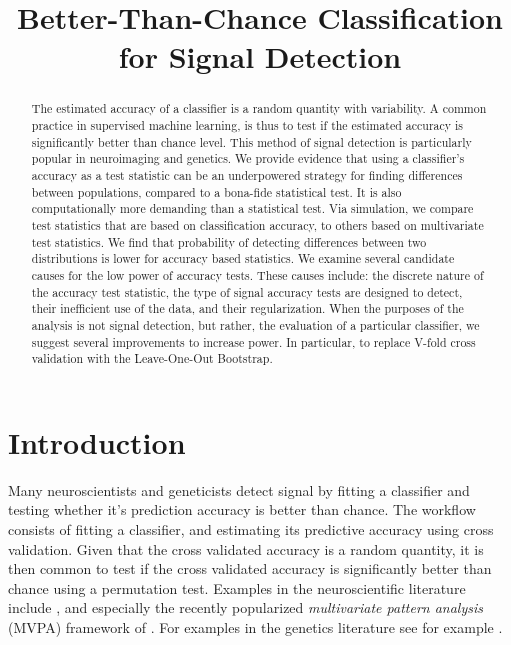 \documentclass[12pt,a4paper]{article}
\title{Better-Than-Chance Classification for Signal Detection}
\begin{document}
\maketitle

\begin{abstract}
The estimated accuracy of a classifier is a random quantity with variability. 
A common practice in supervised machine learning, is thus to test if the estimated accuracy is significantly better than chance level.
This method of signal detection is particularly popular in neuroimaging and genetics.
We provide evidence that using a classifier's accuracy as a test statistic can be an underpowered strategy for finding differences between populations, compared to a bona-fide statistical test.
It is also computationally more demanding than a statistical test. 
Via simulation, we compare test statistics that are based on classification accuracy, to others based on multivariate test statistics. 
We find that probability of detecting differences between two distributions is lower for accuracy based statistics.
We examine several candidate causes for the low power of accuracy tests. 
These causes include: the discrete nature of the accuracy test statistic, the type of signal accuracy tests are designed to detect, their inefficient use of the data, and their regularization. 
When the purposes of the analysis is not signal detection, but rather, the evaluation of a particular classifier, we suggest several improvements to increase power. 
In particular, to replace V-fold cross validation with the Leave-One-Out Bootstrap.
\end{abstract}




\section{Introduction}
\label{sec:introduction}

Many neuroscientists and geneticists detect signal by fitting a classifier and testing whether it's prediction accuracy is better than chance. 
The workflow consists of fitting a classifier, and estimating its predictive accuracy using cross validation. 
Given that the cross validated accuracy is a random quantity, it is then common to test if the cross validated accuracy is significantly better than chance using a permutation test.  
Examples in the neuroscientific literature include \citet{golland_permutation_2003,pereira_machine_2009,schreiber2013statistical,varoquaux_assessing_2016}, and especially the recently popularized \emph{multivariate pattern analysis} (MVPA) framework of \citet{kriegeskorte_information-based_2006}.
For examples in the genetics literature see for example
\citet{golub_molecular_1999,slonim_class_2000,radmacher_paradigm_2002,mukherjee_estimating_2003,juan_prediction_2004,jiang_calculating_2008}.
\end{document}

